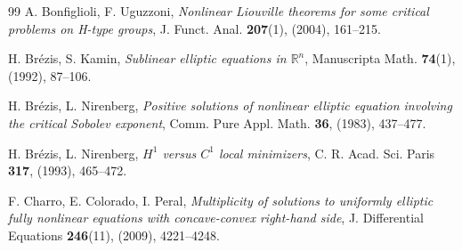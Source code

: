 \documentclass[11pt]{amsart}
\numberwithin{equation}{section} %
\theoremstyle{definition}
\begin{document}
\begin{thebibliography}{99}
	A. Bonfiglioli, F. Uguzzoni,
	{\em Nonlinear Liouville theorems for some critical
		problems on H-type groups},
	J. Funct. Anal. {\bf 207}(1), (2004), 161--215.
	
	
	
	
	
%	
	
	H. Br\'{e}zis, S. Kamin, 
	{\em Sublinear elliptic equations in $\mathbb{R}^{n}$},
	Manuscripta Math. {\bf 74}(1), (1992), 87--106.
	
	
	H. Br\'{e}zis, L. Nirenberg, 
	{\em Positive solutions of nonlinear elliptic equation involving the critical Sobolev exponent}, 
	Comm. Pure Appl. Math. {\bf 36}, (1983), 437--477. 
	
	
	
		H. Br\'{e}zis, L. Nirenberg, 
		{\em $H^1$ versus $C^1$ local minimizers}, 
		C. R. Acad. Sci. Paris {\bf 317}, (1993), 465--472. 
	
		
	
	F. Charro, E. Colorado, I. Peral, 
	{\em Multiplicity of solutions to uniformly elliptic fully nonlinear equations with concave-convex right-hand side}, 
	J. Differential Equations {\bf 246}(11), (2009), 4221--4248.
	

\end{thebibliography}
\end{document}
